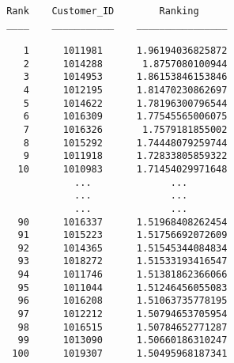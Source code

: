 \begin{lstlisting}
                    Rank    Customer_ID        Ranking                                    
                    ____    ___________    ________________                               

                       1      1011981      1.96194036825872                               
                       2      1014288       1.8757080100944                               
                       3      1014953      1.86153846153846                               
                       4      1012195      1.81470230862697                               
                       5      1014622      1.78196300796544                               
                       6      1016309      1.77545565006075                               
                       7      1016326       1.7579181855002                               
                       8      1015292      1.74448079259744                               
                       9      1011918      1.72833805859322                               
                      10      1010983      1.71454029971648                               
                                ...              ...                                      
                                ...              ...                                      
                                ...              ...                                      
                      90      1016337      1.51968408262454                               
                      91      1015223      1.51756692072609                               
                      92      1014365      1.51545344084834                               
                      93      1018272      1.51533193416547                               
                      94      1011746      1.51381862366066                               
                      95      1011044      1.51246456055083                               
                      96      1016208      1.51063735778195                               
                      97      1012212      1.50794653705954                               
                      98      1016515      1.50784652771287                               
                      99      1013090      1.50660186310247                               
                     100      1019307      1.50495968187341                               
\end{lstlisting}

